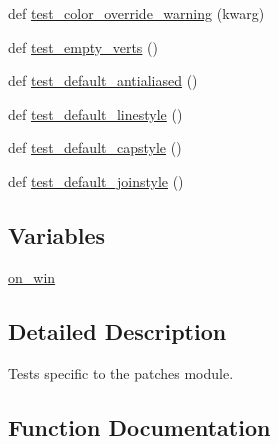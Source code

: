 \begin{DoxyCompactItemize}
\item 
def \hyperlink{namespacematplotlib_1_1tests_1_1test__patches_aad2c517a84e73430a0d66a84aea6b563}{test\+\_\+color\+\_\+override\+\_\+warning} (kwarg)
\item 
def \hyperlink{namespacematplotlib_1_1tests_1_1test__patches_a9267abbe0ed17ecac40632f48f181c04}{test\+\_\+empty\+\_\+verts} ()
\item 
def \hyperlink{namespacematplotlib_1_1tests_1_1test__patches_a4713721d458381fe982b1a21d7a35a21}{test\+\_\+default\+\_\+antialiased} ()
\item 
def \hyperlink{namespacematplotlib_1_1tests_1_1test__patches_a38f0269acadbea7a2eec8a2a06f89566}{test\+\_\+default\+\_\+linestyle} ()
\item 
def \hyperlink{namespacematplotlib_1_1tests_1_1test__patches_a6d1605e747f809c15b19829e7788d224}{test\+\_\+default\+\_\+capstyle} ()
\item 
def \hyperlink{namespacematplotlib_1_1tests_1_1test__patches_ac30a3c11de605cd0363ba73f0f3bc01e}{test\+\_\+default\+\_\+joinstyle} ()
\end{DoxyCompactItemize}
\subsection*{Variables}
\begin{DoxyCompactItemize}
\item 
\hyperlink{namespacematplotlib_1_1tests_1_1test__patches_a0775460d310e1912c23340e61d988a55}{on\+\_\+win}
\end{DoxyCompactItemize}


\subsection{Detailed Description}
\begin{DoxyVerb}Tests specific to the patches module.
\end{DoxyVerb}
 

\subsection{Function Documentation}
\mbox{\label{namespacematplotlib_1_1tests_1_1test__patches_ac37592c58e6a316478c668ebbb8a73c4}} 
